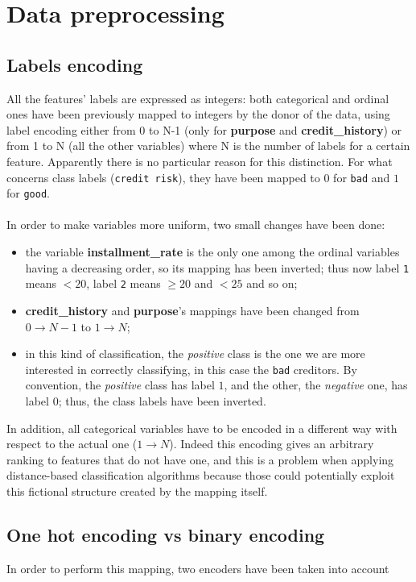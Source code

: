 \documentclass[letterpaper]{article}
\begin{document}
	\section{Data preprocessing}
	\subsection{Labels encoding}
	All the features' labels are expressed as integers: both categorical and ordinal ones have been previously mapped to integers by the donor of the data, using label encoding either from 0 to N-1 (only for \textbf{purpose} and \textbf{credit\_history}) or from 1 to N (all the other variables) where N is the number of labels for a certain feature. Apparently there is no particular reason for this distinction. For what concerns class labels (\texttt{credit risk}), they have been mapped to $0$ for \texttt{bad} and $1$ for \texttt{good}. \\
	\paragraph{}In order to make variables more uniform, two small changes have been done:
	\begin{itemize}
		\item the variable \textbf{installment\_rate} is the only one among the ordinal variables having a decreasing order, so its mapping has been inverted; thus now label \texttt{1} means $< 20$, label \texttt{2} means $\geq 20$ and $< 25$ and so on;
		\item \textbf{credit\_history} and \textbf{purpose}'s mappings have been changed from $0 \rightarrow N-1$ to $1 \rightarrow N$;
		\item in this kind of classification, the \emph{positive} class is the one we are more interested in correctly classifying, in this case the \texttt{bad} creditors. By convention, the \emph{positive} class has label $1$, and the other, the \emph{negative} one, has label $0$; thus, the class labels have been inverted.
	\end{itemize}
	In addition, all categorical variables have to be encoded in a different way with respect to the actual one ($1 \rightarrow N$). Indeed this encoding gives an arbitrary ranking to features that do not have one, and this is a problem when applying distance-based classification algorithms because those could potentially exploit this fictional structure created by the mapping itself.
	\subsection{One hot encoding vs binary encoding}
	In order to perform this mapping, two encoders have been taken into account
\end{document}
